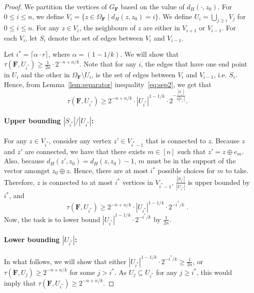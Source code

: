 \documentclass[11pt, letterpaper]{article}
\theoremstyle{definition}
\newcommand{\f}{\mathbf{F}}
\newcommand{\Om}{\Omega_{\f}}
\begin{document}
\begin{proof}
    We partition the vertices of $G_\f$ based on the value of $d_H(\cdot, z_0)$. For $ 0\leq i \leq n$, we define $V_i = \{ z \in \Om \mid d_H(z,z_0)= i\}$. We define $U_i = \bigcup_{j \geq i} V_j$ for $0 \leq i \leq n$. For any $z \in V_i$, the neighbours of $z$ are either in $V_{i+1}$ or $V_{i-1}$. For each $V_i$, let $S_i$ denote the set of edges between $V_i$ and $V_{i-1}$. 

    \medskip \noindent
    Let $i^*= \lceil \alpha \cdot r \rceil$, where $\alpha = \left(1-1/k\right)$. We will show that $\tau(\f, U_{i^*}) \geq \frac{1}{2n} \cdot 2^{-n+n/k}$. Note that for any $i$, the edges that have one end point in $U_{i}$ and the other in $\Om \setminus U_{i}$, is the set of edges between $V_{i}$ and $V_{i-1}$, i.e. $S_i$. Hence, from Lemma~\ref{lem:separator} inequality~\ref{eq:sep2}, we get that \[\tau(\f, U_{i^*}) \geq 2^{-n+n/k} \cdot |U_{i^*}|^{1-1/k} \cdot 2^{-\frac{|S_{i^*}|}{k|U_{i^*}|}}.\]
    \paragraph{Upper bounding $|S_{i^*}|/|U_{i^*}|$:} For any $z \in V_{i^*}$, consider any vertex $z' \in V_{i^*-1}$ that is connected to $z$. Because $z$ and $z'$ are connected, we have that there exists $m \in [n]$ such that $z'=z\oplus e_m$. Also, because $d_H(z', z_0)=d_H(z, z_0)-1$,  $m$ must be in the support of the vector amongst $z_0 \oplus z$. Hence, there are at most $i^*$ possible choices for $m$ to take. Therefore, $z$ is connected to at most $i^*$ vertices in $V_{i^*-1}$, $\frac{|S_{i^*}|}{|U_{i^*}|}$ is upper bounded by $i^*$, and
    \[ \tau(\f, U_{i^*}) \geq 2^{-n+n/k} \cdot |U_{i^*}|^{1-1/k} \cdot 2^{ -i^*/k} \;.\]
    Now, the task is to lower bound $|U_{i^*}|^{1-1/k} \cdot 2^{ -i^*/k}$ by $\frac{1}{2n}$.

    \paragraph{Lower bounding $|U_{i^*}|$:} In what follows, we will show that either $|U_{i^*}|^{1-1/k} \cdot 2^{ -i^*/k} \geq \frac{1}{2n}$, or $\tau(\f, U_j) \geq 2^{-n+n/k}$ for some $j > i^*$. As $U_j \subseteq U_{i^*}$ for any $j \geq i^*$, this would imply that $\tau(\f, U_{i^*}) \geq 2^{-n+n/k}$. 
    

\end{proof}
\end{document}
